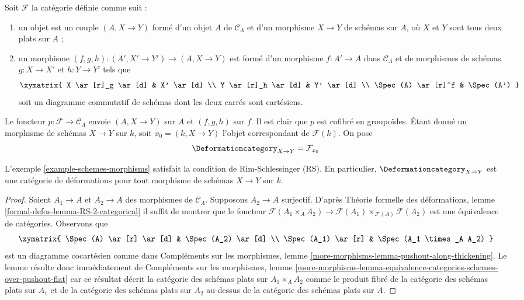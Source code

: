 \begin{example}
\label{example-schemes-morphisms}
Soit $\mathcal{F}$ la catégorie définie comme suit :
\begin{enumerate}
\item un objet est un couple $(A, X \to Y)$ formé d'un
objet $A$ de $\mathcal{C}_\Lambda$ et d'un morphisme
$X \to Y$ de schémas sur $A$, où $X$ et $Y$ sont tous deux plats sur $A$ ;
\item un morphisme $(f, g, h) : (A', X' \to Y') \to (A, X \to Y)$ est formé d'un
morphisme $f : A' \to A$ dans $\mathcal{C}_\Lambda$ et
de morphismes de schémas $g : X \to X'$ et $h : Y \to Y'$ tels que
$$
\xymatrix{
X \ar[r]_g \ar[d] & X' \ar[d] \\
Y \ar[r]_h \ar[d] & Y' \ar[d] \\
\Spec(A) \ar[r]^f & \Spec(A')
}
$$
soit un diagramme commutatif de schémas dont les deux carrés sont cartésiens.
\end{enumerate}
Le foncteur $p : \mathcal{F} \to \mathcal{C}_\Lambda$ envoie $(A, X \to Y)$
sur $A$ et $(f, g, h)$ sur $f$. Il est clair que $p$ est cofibré en groupoïdes.
Étant donné un morphisme de schémas $X \to Y$ sur $k$, soit $x_0 = (k, X \to Y)$
l'objet correspondant de $\mathcal{F}(k)$. On pose
$$
\Deformationcategory_{X \to Y} = \mathcal{F}_{x_0}
$$
\end{example}

\begin{lemma}
\label{lemma-schemes-morphisms-RS}
L'exemple \ref{example-schemes-morphisms}
satisfait la condition de Rim-Schlessinger (RS).
En particulier, $\Deformationcategory_{X \to Y}$ est une catégorie de déformations
pour tout morphisme de schémas $X \to Y$ sur $k$.
\end{lemma}

\begin{proof}
Soient $A_1 \to A$ et $A_2 \to A$ des morphismes de $\mathcal{C}_\Lambda$.
Supposons $A_2 \to A$ surjectif. D'après Théorie formelle
des déformations, lemme
\ref{formal-defos-lemma-RS-2-categorical}
il suffit de montrer que le foncteur
$\mathcal{F}(A_1 \times_A A_2) \to
\mathcal{F}(A_1) \times_{\mathcal{F}(A)} \mathcal{F}(A_2)$
est une équivalence de catégories.
Observons que
$$
\xymatrix{
\Spec(A) \ar[r] \ar[d] & \Spec(A_2) \ar[d] \\
\Spec(A_1) \ar[r] &
\Spec(A_1 \times_A A_2)
}
$$
est un diagramme cocartésien comme dans Compléments sur les morphismes, lemme
\ref{more-morphisms-lemma-pushout-along-thickening}.
Le lemme résulte donc immédiatement de
Compléments sur les morphismes, lemme
\ref{more-morphisms-lemma-equivalence-categories-schemes-over-pushout-flat}
car ce résultat décrit la catégorie des schémas plats sur $A_1 \times_A A_2$
comme le produit fibré de la catégorie des schémas plats sur $A_1$
et de la catégorie des schémas plats sur $A_2$ au-dessus de la catégorie des
schémas plats sur $A$.
\end{proof}

